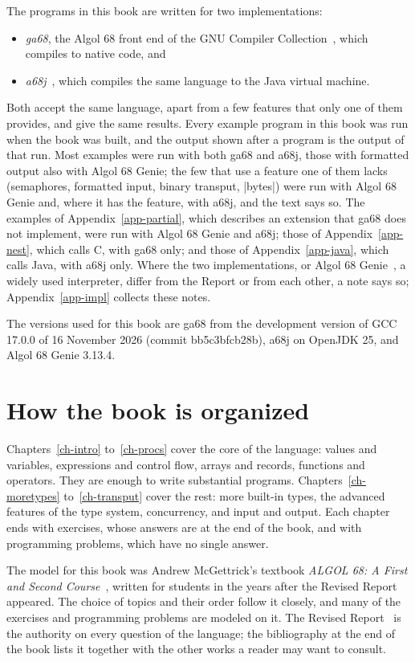 The programs in this book are written for two implementations:
\begin{itemize}
\item \emph{ga68}, the Algol 68 front end of the GNU Compiler
  Collection~\cite{ga68}, which compiles to native code, and
\item \emph{a68j}~\cite{a68j}, which compiles the same language to the
  Java virtual machine.
\end{itemize}
Both accept the same language, apart from a few features that only one
of them provides, and give the same results. Every example program in
this book was run when the book was built, and the output shown after a
program is the output of that run. Most examples were run with both
ga68 and a68j, those with formatted output also with Algol 68 Genie;
the few that use a feature one of them lacks (semaphores, formatted
input, binary transput, \code|bytes|) were run with Algol 68 Genie and,
where it has the feature, with a68j, and the text says so.
The examples of Appendix~\ref{app-partial}, which describes an
extension that ga68 does not implement, were run with Algol 68 Genie and
a68j; those of Appendix~\ref{app-nest}, which calls C, with ga68 only;
and those of Appendix~\ref{app-java}, which calls Java, with a68j only.
Where the two implementations, or Algol 68 Genie~\cite{genie}, a widely
used interpreter, differ from the Report or from each other, a note says so;
Appendix~\ref{app-impl} collects these notes.

The versions used for this book are ga68 from the development
version of GCC 17.0.0 of 16 November 2026 (commit bb5c3bfcb28b), a68j \bookversion{} on OpenJDK 25, and Algol 68
Genie 3.13.4.

\section*{How the book is organized}

Chapters~\ref{ch-intro} to~\ref{ch-procs} cover the core of the language: values and variables,
expressions and control flow, arrays and records, functions and
operators. They are enough to write substantial programs. Chapters~\ref{ch-moretypes} to~\ref{ch-transput}
cover the rest: more built-in types, the advanced features of the type
system, concurrency, and input and output. Each chapter ends with
exercises, whose answers are at the end of the book, and with programming
problems, which have no single answer.

The model for this book was Andrew McGettrick's textbook \emph{ALGOL 68:
A First and Second Course}~\cite{mcgettrick}, written for students in the
years after the Revised Report appeared. The choice of topics and their
order follow it closely, and many of the exercises and programming
problems are modeled on it. The Revised
Report~\cite{rr} is the authority on every question of the language; the
bibliography at the end of the book lists it together with the other
works a reader may want to consult.

